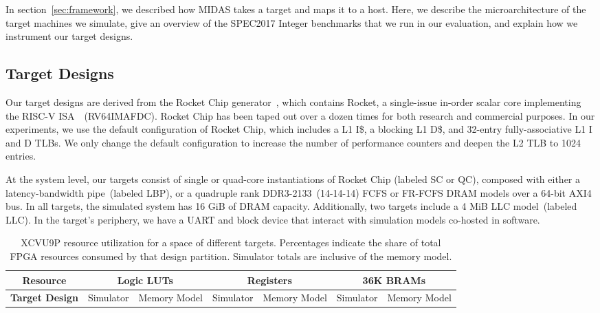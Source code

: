 In section~\ref{sec:framework}, we described how MIDAS takes a target and
maps it to a host. Here, we describe the microarchitecture of the target
machines we simulate, give an overview of the SPEC2017 Integer benchmarks that
we run in our evaluation, and explain how we instrument our target designs.

\subsection{Target Designs}\label{sec:target-parameters} Our target designs 
are derived from the Rocket Chip generator~\cite{rocketchip}, which contains
Rocket, a single-issue in-order scalar core implementing the RISC-V
ISA~\cite{Waterman:EECS-2016-118, Waterman:EECS-2016-161}~(RV64IMAFDC). Rocket Chip
has been taped out over a dozen times for both research and commercial
purposes. In our
experiments, we use the default
configuration of Rocket Chip, which includes
a  L1 I\$, a blocking  L1 D\$, and 32-entry
fully-associative L1 I and D TLBs. We only change the default configuration to
increase the number of performance counters and deepen the L2 TLB to 1024 entries.

At the system level, our targets consist of single or quad-core instantiations
of Rocket Chip (labeled SC or QC), composed with either a latency-bandwidth
pipe~(labeled LBP), or a quadruple rank DDR3-2133~(14-14-14) FCFS or FR-FCFS
DRAM models over a 64-bit AXI4 bus. In all targets, the simulated system has
16 GiB of DRAM capacity. Additionally, two targets include a 4 MiB
LLC model~(labeled LLC). In the target's periphery, we have a UART and block
device that interact with simulation models co-hosted in software.

\begin{table*}
\centering
    \begin{tabular}{|c|c|c|c|c|c|c|c|c|c|c|c|c|}
	\hline
        \textbf{Resource} & \multicolumn{4}{|c|}{Logic LUTs} &
        \multicolumn{4}{|c|}{Registers} &
        \multicolumn{4}{|c|}{36K BRAMs} \\
	\hline
	\hline
        \textbf{Target Design} &
        \multicolumn{2}{|c|}{Simulator} &
        \multicolumn{2}{|c|}{Memory Model} &
        \multicolumn{2}{|c|}{Simulator} &
        \multicolumn{2}{|c|}{Memory Model} &
        \multicolumn{2}{|c|}{Simulator} &
        \multicolumn{2}{|c|}{Memory Model} \\
	\hline
    
	\hline
	\end{tabular}

    \caption{XCVU9P resource utilization for a space of different targets.
    Percentages indicate the share of total FPGA resources consumed by that
    design partition. Simulator totals are inclusive of the memory model.}
\label{tbl:utilization}
\vspace{-0.1in}
\end{table*}

